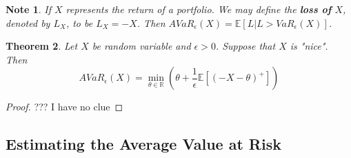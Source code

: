 \documentclass[12pt]{amsart}
\newtheorem{thm}{Theorem}[section]
\newtheorem{note}[thm]{Note}
\newcommand{\ep}{\epsilon}
\newcommand{\E}{\mathbb{E}}
\newcommand{\R}{\mathbb{R}}
\begin{document}
\begin{note}
If $X$ represents the return of a portfolio. We may define the \textbf{loss of} $X$, denoted by $L_X$, to be $L_X = -X$. Then $AVaR_{\ep}(X) = \E[L|L>VaR_{\ep}(X)]$.  
\end{note}

\begin{thm}
Let $X$ be random variable and $\ep>0$. Suppose that $X$ is "nice". Then $$AVaR_{\ep}(X) = \min_{\theta \in \R} (\theta + \frac{1}{\ep}\E[(-X - \theta)^+])$$
\end{thm}

\begin{proof}
??? I have no clue
\end{proof}

\subsection{Estimating the Average Value at Risk}
\end{document}
